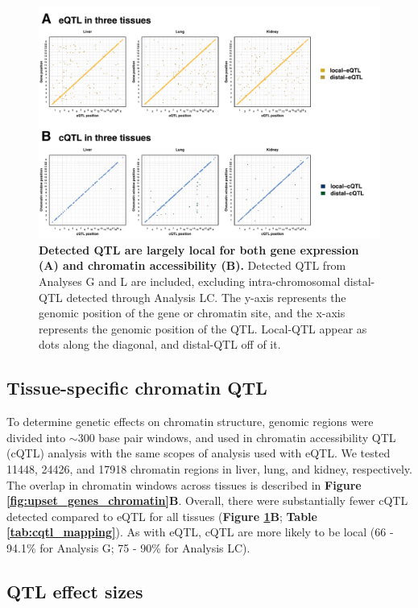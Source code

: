 \documentclass[9pt,twocolumn,twoside]{gsajnl}
\begin{document}
\begin{figure}[h]
\renewcommand{\familydefault}{\sfdefault}\normalfont
\centering
\includegraphics[width=\textwidth, trim={0in 0in 0in 0in}, clip]{figs/qtl_map_main.pdf}
\caption{\textbf{Detected QTL are largely local for both gene expression (A) and chromatin accessibility (B).} Detected QTL from Analyses G and L are included, excluding intra-chromosomal distal-QTL detected through Analysis LC. The y-axis represents the genomic position of the gene or chromatin site, and the x-axis represents the genomic position of the QTL. Local-QTL appear as dots along the diagonal, and distal-QTL off of it.
\label{fig:grid_plot}}
\end{figure}

\subsection{Tissue-specific chromatin QTL}

To determine genetic effects on chromatin structure, genomic regions were divided into $\sim$300 base pair windows, and used in chromatin accessibility QTL (cQTL) analysis with the same scopes of analysis used with eQTL. We tested 11448, 24426, and 17918 chromatin regions in liver, lung, and kidney, respectively. The overlap in chromatin windows across tissues is described in \textbf{Figure \ref{fig:upset_genes_chromatin}B}. Overall, there were substantially fewer cQTL detected compared to eQTL for all tissues (\textbf{Figure \ref{fig:grid_plot}B}; \textbf{Table \ref{tab:cqtl_mapping}}). As with eQTL, cQTL are more likely to be local (66 - 94.1\% for Analysis G; 75 - 90\% for Analysis LC).

\subsection{QTL effect sizes}
\end{document}
